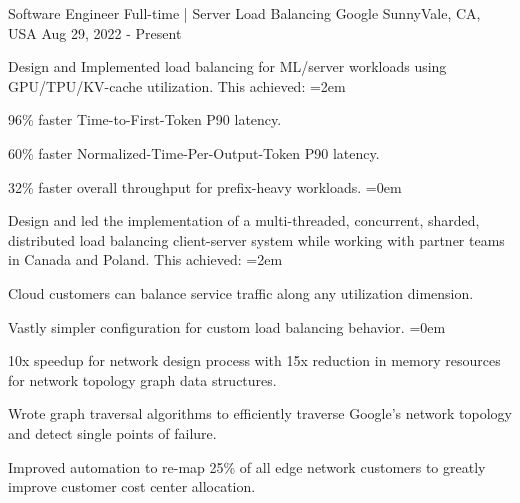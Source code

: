 
\begin{cventries}
  \cventry
    {Software Engineer Full-time | Server Load Balancing} %
    {Google} %
    {SunnyVale, CA, USA} %
    {Aug 29, 2022 - Present} %
    {
      \begin{cvitems} %
        \item {Design and Implemented load balancing for ML/server workloads
          using GPU/TPU/KV-cache utilization. This achieved:}
        \itemindent=2em
          \item {96\% faster Time-to-First-Token P90 latency.}
          \item {60\% faster Normalized-Time-Per-Output-Token P90 latency.}
          \item {32\% faster overall throughput for prefix-heavy workloads.}
        \itemindent=0em
        \item {Design and led the implementation of a multi-threaded,
          concurrent, sharded, distributed load balancing client-server system
          while working with partner teams in Canada and Poland. This achieved:}
        \itemindent=2em
        \item {Cloud customers can balance service traffic along any
          utilization dimension.}
        \item {Vastly simpler configuration for custom load balancing behavior.}
        \itemindent=0em
        \item {10x speedup for network design process with 15x reduction in
          memory resources for network topology graph data structures.}
        \item {Wrote graph traversal algorithms to efficiently traverse Google's
          network topology and detect single points of failure.}
        \item {Improved automation to re-map 25\% of all edge network customers
          to greatly improve customer cost center allocation.}
      \end{cvitems}
    }


\end{cventries}
